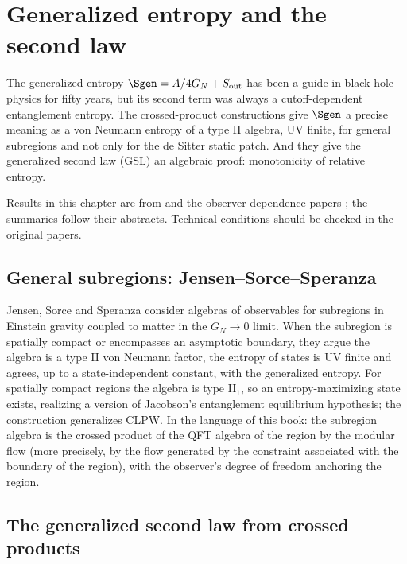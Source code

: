 \chapter{Generalized entropy and the second law}\label{ch:gen_entropy}

\begin{physmotiv}
The generalized entropy $\Sgen=A/4G_N+S_{\rm out}$ has been a guide in black hole physics for fifty years, but its second term was always a cutoff-dependent entanglement entropy. The crossed-product constructions give $\Sgen$ a precise meaning as a von Neumann entropy of a type II algebra, UV finite, for general subregions and not only for the de Sitter static patch. And they give the generalized second law (GSL) an algebraic proof: monotonicity of relative entropy.
\end{physmotiv}

\begin{unsettled}
Results in this chapter are from \cite{JSS2023,FaulknerSperanza2024,Kirklin2024GSL} and the observer-dependence papers \cite{DEHK2024a,DEHK2024b}; the summaries follow their abstracts. Technical conditions should be checked in the original papers.
\end{unsettled}

\section{General subregions: Jensen--Sorce--Speranza}

Jensen, Sorce and Speranza \cite{JSS2023} consider algebras of observables for subregions in Einstein gravity coupled to matter in the $G_N\to0$ limit. When the subregion is spatially compact or encompasses an asymptotic boundary, they argue the algebra is a type II von Neumann factor, the entropy of states is UV finite and agrees, up to a state-independent constant, with the generalized entropy. For spatially compact regions the algebra is type II$_1$, so an entropy-maximizing state exists, realizing a version of Jacobson's entanglement equilibrium hypothesis; the construction generalizes CLPW. In the language of this book: the subregion algebra is the crossed product of the QFT algebra of the region by the modular flow (more precisely, by the flow generated by the constraint associated with the boundary of the region), with the observer's degree of freedom anchoring the region.

\section{The generalized second law from crossed products}


